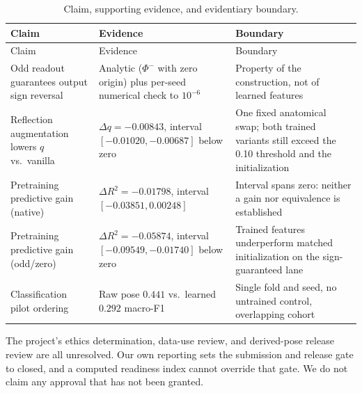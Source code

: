 \documentclass{article}
\begin{document}
\begin{longtable}[]{@{}
  >{\raggedright\arraybackslash}p{}
  >{\raggedright\arraybackslash}p{}
  >{\raggedright\arraybackslash}p{}@{}}
\caption{Claim, supporting evidence, and evidentiary
boundary.}\tabularnewline
\toprule\noalign{}
\begin{minipage}[b]{\linewidth}\raggedright
Claim
\end{minipage} & \begin{minipage}[b]{\linewidth}\raggedright
Evidence
\end{minipage} & \begin{minipage}[b]{\linewidth}\raggedright
Boundary
\end{minipage} \\
\midrule\noalign{}
\endfirsthead
\toprule\noalign{}
\begin{minipage}[b]{\linewidth}\raggedright
Claim
\end{minipage} & \begin{minipage}[b]{\linewidth}\raggedright
Evidence
\end{minipage} & \begin{minipage}[b]{\linewidth}\raggedright
Boundary
\end{minipage} \\
\midrule\noalign{}
\endhead
\bottomrule\noalign{}
\endlastfoot
Odd readout guarantees output sign reversal & Analytic (\(\Phi^-\) with
zero origin) plus per-seed numerical check to \(10^{-6}\) & Property of
the construction, not of learned features \\
Reflection augmentation lowers \(q\) vs.~vanilla &
\(\Delta q = -0.00843\), interval \([-0.01020, -0.00687]\) below zero &
One fixed anatomical swap; both trained variants still exceed the 0.10
threshold and the initialization \\
Pretraining predictive gain (native) & \(\Delta R^2 = -0.01798\),
interval \([-0.03851, 0.00248]\) & Interval spans zero: neither a gain
nor equivalence is established \\
Pretraining predictive gain (odd/zero) & \(\Delta R^2 = -0.05874\),
interval \([-0.09549, -0.01740]\) below zero & Trained features
underperform matched initialization on the sign-guaranteed lane \\
Classification pilot ordering & Raw pose \(0.441\) vs.~learned \(0.292\)
macro-F1 & Single fold and seed, no untrained control, overlapping
cohort \\
\end{longtable}

The project's ethics determination, data-use review, and derived-pose
release review are all unresolved. Our own reporting sets the submission
and release gate to closed, and a computed readiness index cannot
override that gate. We do not claim any approval that has not been
granted.
\clearpage
{\small


}
\end{document}
